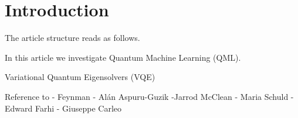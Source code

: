 \section{Introduction}\label{section:Introduction}



The article structure reads as follows.

In this article we investigate Quantum Machine Learning (QML).

Variational Quantum Eigensolvers (VQE)

Reference to 
- Feynman
- Alán Aspuru-Guzik
-Jarrod McClean
- Maria Schuld
- Edward Farhi
- Giuseppe Carleo
